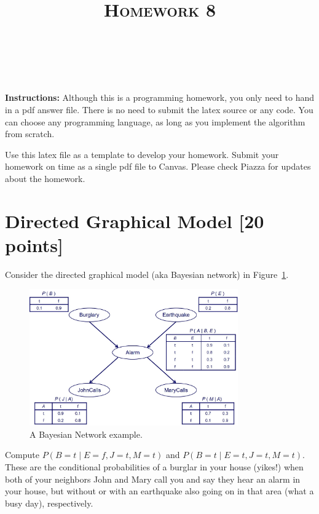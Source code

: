 \documentclass[a4paper]{article}
\title{\textsc{Homework 8}} %
\author{
\red{$AKASH SHARMA$} \\
\red{$9081731771$}\\
}
\date{}
\theoremstyle{definition}
\begin{document}
\maketitle 


\textbf{Instructions:} 
Although this is a programming homework, you only need to hand in a pdf answer file.
There is no need to submit the latex source or any code.
You can choose any programming language, as long as you implement the algorithm from scratch.

Use this latex file as a template to develop your homework.
Submit your homework on time as a single pdf file to Canvas.
Please check Piazza for updates about the homework.


\section{Directed Graphical Model [20 points]}
Consider the directed graphical model (aka Bayesian network) in Figure~\ref{fig:bn}.
\begin{figure}[H]
        \centering
                \includegraphics[width=0.8\textwidth]{BN.jpg}
        \caption{A Bayesian Network example.}
        \label{fig:bn}
\end{figure}
Compute $P(B=t \mid E=f,J=t,M=t)$ and $P(B=t \mid E=t,J=t,M=t)$.
These are the conditional probabilities of a burglar in your house (yikes!) when both of your neighbors John and Mary call you and say they hear an alarm in your house, but without or with an earthquake also going on in that area (what a busy day), respectively.
\end{document}
